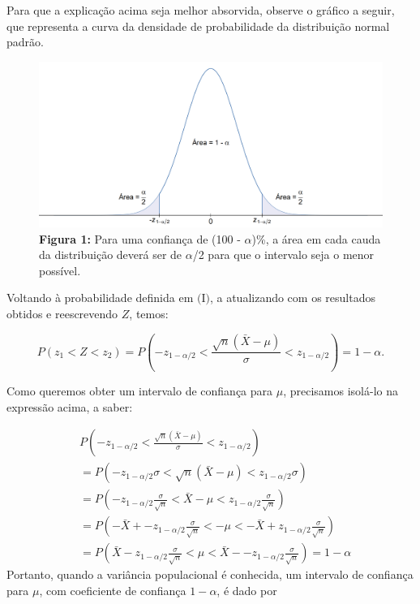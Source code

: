 \documentclass[
  letterpaper,
  DIV=11,
  numbers=noendperiod]{scrreprt}
\begin{document}
Para que a explicação acima seja melhor absorvida, observe o gráfico a
seguir, que representa a curva da densidade de probabilidade da
distribuição normal padrão.

\begin{figure}

{\centering \includegraphics[width=1\textwidth,height=\textheight]{./figuras_estimacao/normal_padrao.png}

}

\caption{\textbf{Figura 1:} Para uma confiança de (100 - \(\alpha\))\%,
a área em cada cauda da distribuição deverá ser de \(\alpha\)/2 para que
o intervalo seja o menor possível.}

\end{figure}

Voltando à probabilidade definida em \(\text{(I)}\), a atualizando com
os resultados obtidos e reescrevendo \(Z\), temos:

\[
P(z_1 < Z < z_2) = P \left(-z_{1 - \alpha/2} < \frac{\sqrt{n}\left(\bar{X} - \mu\right)}{\sigma}  < z_{1 - \alpha/2} \right)  = 1 - \alpha.
\]

Como queremos obter um intervalo de confiança para \(\mu\), precisamos
isolá-lo na expressão acima, a saber:

\[
\begin{align}
& P\left(-z_{1 - \alpha/2} < \frac{\sqrt{n}\left(\bar{X} - \mu\right)}{\sigma} < z_{1 - \alpha/2} \right) \\ & 
= P\left(-z_{1 - \alpha/2}\sigma < \sqrt{n}\left(\bar{X} - \mu\right) < z_{1 - \alpha/2}\sigma \right)  \\ &
= P\left(-z_{1 - \alpha/2}\frac{\sigma}{\sqrt{n}} < \bar{X} - \mu < z_{1 - \alpha/2}\frac{\sigma}{\sqrt{n}} \right) \\  &
= P\left(-\bar{X} + -z_{1 - \alpha/2}\frac{\sigma}{\sqrt{n}} < - \mu < -\bar{X} + z_{1 - \alpha/2}\frac{\sigma}{\sqrt{n}} \right) \\ & = P\left(\bar{X} - z_{1 - \alpha/2}\frac{\sigma}{\sqrt{n}} < \mu < \bar{X} - -z_{1 - \alpha/2}\frac{\sigma}{\sqrt{n}} \right) = 1 - \alpha
\end{align}
\] Portanto, quando a variância populacional é conhecida, um intervalo
de confiança para \(\mu\), com coeficiente de confiança \(1 - \alpha\),
é dado por
\end{document}
